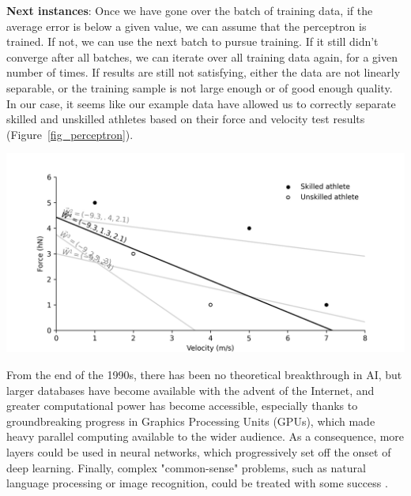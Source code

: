 \begin{tcolorbox}[nofloat, colback=white,colframe=black, colbacktitle=white, coltitle=black, breakable, title=\textbf{Example 1} Athlete classification with a perceptron, label=example1]
      \textbf{Next instances}: Once we have gone over the batch of training data, if the average error is below a given value, we can assume that the perceptron is trained. If not, we can use the next batch to pursue training. If it still didn't converge after all batches, we can iterate over all training data again, for a given number of times. If results are still not satisfying, either the data are not linearly separable, or the training sample is not large enough or of good enough quality. In our case, it seems like our example data have allowed us to correctly separate skilled and unskilled athletes based on their force and velocity test results (Figure~\ref{fig_perceptron}).

      {
      \begin{center}
      \def\svgwidth{1\columnwidth}
      \fontsize{10pt}{10pt}\selectfont
      \centerline{\includegraphics[width=0.9\linewidth]{"../Chap2/Figures/Fig_perceptron.png"}}
      \label{fig_perceptron}
      \end{center}
      }
\end{tcolorbox}

\newpage

From the end of the 1990s, there has been no theoretical breakthrough in AI, but larger databases have become available with the advent of the Internet, and greater computational power has become accessible, especially thanks to groundbreaking progress in Graphics Processing Units (GPUs), which made heavy parallel computing available to the wider audience. As a consequence, more layers could be used in neural networks, which progressively set off the onset of deep learning. Finally, complex "common-sense" problems, such as natural language processing or image recognition, could be treated with some success \cite{Baral2018}.

